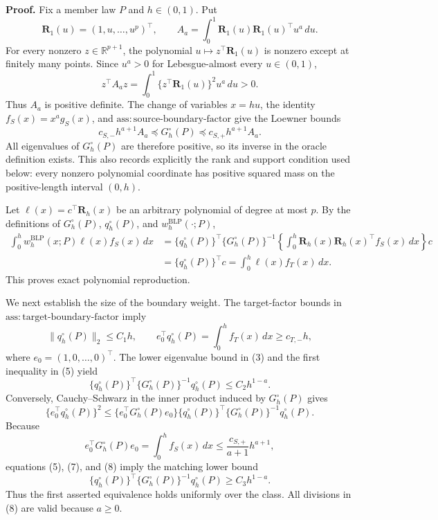 \textbf{Proof.}
Fix a member law \(P\) and \(h\in(0,1)\). Put
\[
\mathbf R_1(u)=(1,u,\ldots,u^p)^\top,
\qquad
A_a=\int_0^1\mathbf R_1(u)\mathbf R_1(u)^\top u^a\,du.
\tag{1}
\]
For every nonzero \(z\in\mathbb R^{p+1}\), the polynomial
\(u\mapsto z^\top\mathbf R_1(u)\) is nonzero except at finitely many points. Since
\(u^a>0\) for Lebesgue-almost every \(u\in(0,1)\),
\[
z^\top A_a z=\int_0^1\{z^\top\mathbf R_1(u)\}^2u^a\,du>0.
\tag{2}
\]
Thus \(A_a\) is positive definite. The change of variables \(x=hu\), the identity
\(f_S(x)=x^ag_S(x)\), and \(\mathrm{ass:source\text{-}boundary\text{-}factor}\) give the Loewner bounds
\[
c_{S,-}h^{a+1}A_a
\preceq G_h^{\circ}(P)
\preceq c_{S,+}h^{a+1}A_a.
\tag{3}
\]
All eigenvalues of \(G_h^{\circ}(P)\) are therefore positive, so its inverse in the oracle definition exists. This also records explicitly the rank and support condition used below: every nonzero polynomial coordinate has positive squared mass on the positive-length interval \((0,h)\).

Let \(\ell(x)=c^\top\mathbf R_h(x)\) be an arbitrary polynomial of degree at most \(p\). By the definitions of \(G_h^{\circ}(P)\), \(q_h^{\circ}(P)\), and \(w_h^{\mathrm{BLP}}(\cdot;P)\),
\[
\begin{aligned}
\int_0^h w_h^{\mathrm{BLP}}(x;P)\ell(x)f_S(x)\,dx
&=\{q_h^{\circ}(P)\}^\top\{G_h^{\circ}(P)\}^{-1}
  \left\{\int_0^h\mathbf R_h(x)\mathbf R_h(x)^\top f_S(x)\,dx\right\}c\\
&=\{q_h^{\circ}(P)\}^\top c
=\int_0^h\ell(x)f_T(x)\,dx.
\end{aligned}
\tag{4}
\]
This proves exact polynomial reproduction.

We next establish the size of the boundary weight. The target-factor bounds in \(\mathrm{ass:target\text{-}boundary\text{-}factor}\) imply
\[
\|q_h^{\circ}(P)\|_2\le C_1h,
\qquad
e_0^\top q_h^{\circ}(P)=\int_0^hf_T(x)\,dx\ge c_{T,-}h,
\tag{5}
\]
where \(e_0=(1,0,\ldots,0)^\top\). The lower eigenvalue bound in (3) and the first inequality in (5) yield
\[
\{q_h^{\circ}(P)\}^\top\{G_h^{\circ}(P)\}^{-1}q_h^{\circ}(P)\le C_2h^{1-a}.
\tag{6}
\]
Conversely, Cauchy--Schwarz in the inner product induced by \(G_h^{\circ}(P)\) gives
\[
\{e_0^\top q_h^{\circ}(P)\}^2
\le\{e_0^\top G_h^{\circ}(P)e_0\}
\{q_h^{\circ}(P)\}^\top\{G_h^{\circ}(P)\}^{-1}q_h^{\circ}(P).
\tag{7}
\]
Because
\[
e_0^\top G_h^{\circ}(P)e_0=\int_0^hf_S(x)\,dx
\le \frac{c_{S,+}}{a+1}h^{a+1},
\tag{8}
\]
equations (5), (7), and (8) imply the matching lower bound
\[
\{q_h^{\circ}(P)\}^\top\{G_h^{\circ}(P)\}^{-1}q_h^{\circ}(P)\ge C_3h^{1-a}.
\tag{9}
\]
Thus the first asserted equivalence holds uniformly over the class. All divisions in (8) are valid because \(a\ge0\).

